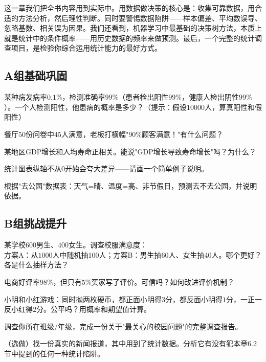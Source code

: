 
这一章我们把全书内容用到实际中。用数据做决策的核心是：收集可靠数据，用合适的方法分析，然后理性判断。同时要警惕数据陷阱——样本偏差、平均数误导、忽略基数、相关误为因果。我们还看到，机器学习中最基础的决策树方法，本质上就是统计中的条件概率——用历史数据的频率来做预测。最后，一个完整的统计调查项目，是检验你综合运用统计能力的最好方式。


\subsection*{A组\quad 基础巩固}

\begin{exercise}
\item 某种病发病率$0.1\%$，检测准确率$99\%$（患者检出阳性$99\%$，健康人检出阴性$99\%$）。一个人检测阳性，他患病的概率是多少？（提示：假设$10000$人，算真阳性和假阳性）
\item 餐厅$50$份问卷中$45$人满意，老板打横幅"$90\%$顾客满意！"有什么问题？
\item 某地区GDP增长和人均寿命正相关。能说"GDP增长导致寿命增长"吗？为什么？
\item 统计图表纵轴不从$0$开始会夸大差异——请画一个简单例子说明。
\item 根据"去公园"数据表：天气=晴、温度=高、非节假日，预测去不去公园，并说明依据。
\end{exercise}

\subsection*{B组\quad 挑战提升}

\begin{exercise}
\item 某学校$600$男生、$400$女生。调查校服满意度：\\
方案A：从$1000$人中随机抽$100$人；方案B：男生抽$60$人、女生抽$40$人。哪个更好？各是什么抽样方法？
\item 电商好评率$98\%$，但只有$5\%$买家写了评价。可信吗？如何改进评价机制？
\item 小明和小红游戏：同时抛两枚硬币，都正面小明得$3$分，都反面小明得$1$分，一正一反小红得$2$分。公平吗？用概率和期望值计算。
\item 调查你所在班级/年级，完成一份关于"最关心的校园问题"的完整调查报告。
\item （选做）找一份真实的新闻报道，其中用到了统计数据。分析它有没有犯本章6.2节中提到的任何一种统计陷阱。
\end{exercise}

\newpage
